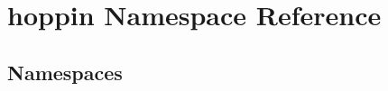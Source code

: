 \hypertarget{namespacehoppin}{}\section{hoppin Namespace Reference}
\label{namespacehoppin}
\subsection*{Namespaces}
\begin{DoxyCompactItemize}
\end{DoxyCompactItemize}

